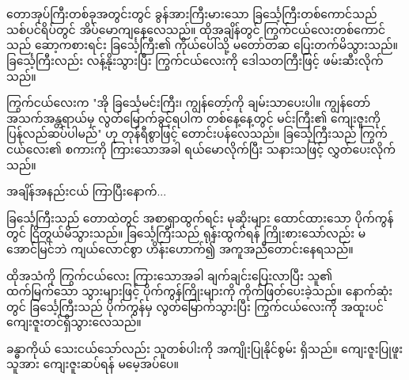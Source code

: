 \documentclass[11pt, a4paper, openany]{book} %
\begin{document}
\clearpage

\tableofcontents

\mainmatter
\renewcommand{\thepage}{\myanmarnumber{\arabic{page}}}

\chapter{}

\begin{myanmar}
တောအုပ်ကြီးတစ်ခုအတွင်းတွင် ခွန်အားကြီးမားသော ခြင်္သေ့ကြီးတစ်ကောင်သည် သစ်ပင်ရိပ်တွင် အိပ်မောကျနေလေသည်။ ထိုအချိန်တွင် ကြွက်ငယ်လေးတစ်ကောင်သည် ဆော့ကစားရင်း ခြင်္သေ့ကြီး၏ ကိုယ်ပေါ်သို့ မတော်တဆ ပြေးတက်မိသွားသည်။ ခြင်္သေ့ကြီးလည်း လန့်နိုးသွားပြီး ကြွက်ငယ်လေးကို ဒေါသတကြီးဖြင့် ဖမ်းဆီးလိုက်သည်။

ကြွက်ငယ်လေးက "အို ခြင်္သေ့မင်းကြီး၊ ကျွန်တော့်ကို ချမ်းသာပေးပါ။ ကျွန်တော် အသက်အန္တရာယ်မှ လွတ်မြောက်ခွင့်ရပါက တစ်နေ့နေ့တွင် မင်းကြီး၏ ကျေးဇူးကို ပြန်လည်ဆပ်ပါမည်" ဟု တုန်ရီစွာဖြင့် တောင်းပန်လေသည်။ ခြင်္သေ့ကြီးသည် ကြွက်ငယ်လေး၏ စကားကို ကြားသောအခါ ရယ်မောလိုက်ပြီး သနားသဖြင့် လွှတ်ပေးလိုက်သည်။

အချိန်အနည်းငယ် ကြာပြီးနောက်...

ခြင်္သေ့ကြီးသည် တောထဲတွင် အစာရှာထွက်ရင်း မုဆိုးများ ထောင်ထားသော ပိုက်ကွန်တွင် ငြိတွယ်မိသွားသည်။ ခြင်္သေ့ကြီးသည် ရုန်းထွက်ရန် ကြိုးစားသော်လည်း မအောင်မြင်ဘဲ ကျယ်လောင်စွာ ဟိန်းဟောက်၍ အကူအညီတောင်းနေရသည်။ 

ထိုအသံကို ကြွက်ငယ်လေး ကြားသောအခါ ချက်ချင်းပြေးလာပြီး သူ၏ ထက်မြက်သော သွားများဖြင့် ပိုက်ကွန်ကြိုးများကို ကိုက်ဖြတ်ပေးခဲ့သည်။ နောက်ဆုံးတွင် ခြင်္သေ့ကြီးသည် ပိုက်ကွန်မှ လွတ်မြောက်သွားပြီး ကြွက်ငယ်လေးကို အထူးပင် ကျေးဇူးတင်ရှိသွားလေသည်။
\end{myanmar}

\vspace{2em}
\noindent
\textbf{\textcolor{brandcolor}{}} 
\begin{myanmar}
ခန္ဓာကိုယ် သေးငယ်သော်လည်း သူတစ်ပါးကို အကျိုးပြုနိုင်စွမ်း ရှိသည်။ ကျေးဇူးပြုဖူးသူအား ကျေးဇူးဆပ်ရန် မမေ့အပ်ပေ။
\end{myanmar}
\end{document}
